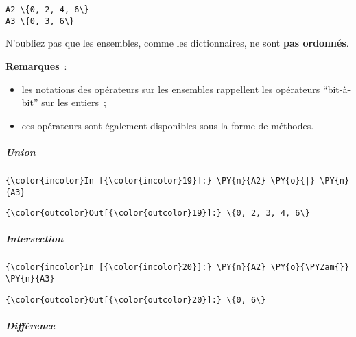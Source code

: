     \begin{Verbatim}[commandchars=\\\{\},frame=single,framerule=0.3mm,rulecolor=\color{cellframecolor}]
A2 \{0, 2, 4, 6\}
A3 \{0, 3, 6\}
\end{Verbatim}

    N'oubliez pas que les ensembles, comme les dictionnaires, ne sont
\textbf{pas ordonnés}.

    \textbf{Remarques}~:

\begin{itemize}
\tightlist
\item
  les notations des opérateurs sur les ensembles rappellent les
  opérateurs ``bit-à-bit'' sur les entiers~;
\item
  ces opérateurs sont également disponibles sous la forme de méthodes.
\end{itemize}

    \hypertarget{union}{%
\subparagraph{Union}\label{union}}

    \begin{Verbatim}[commandchars=\\\{\},frame=single,framerule=0.3mm,rulecolor=\color{cellframecolor}]
{\color{incolor}In [{\color{incolor}19}]:} \PY{n}{A2} \PY{o}{|} \PY{n}{A3}
\end{Verbatim}


\begin{Verbatim}[commandchars=\\\{\},frame=single,framerule=0.3mm,rulecolor=\color{cellframecolor}]
{\color{outcolor}Out[{\color{outcolor}19}]:} \{0, 2, 3, 4, 6\}
\end{Verbatim}
            
    \hypertarget{intersection}{%
\subparagraph{Intersection}\label{intersection}}

    \begin{Verbatim}[commandchars=\\\{\},frame=single,framerule=0.3mm,rulecolor=\color{cellframecolor}]
{\color{incolor}In [{\color{incolor}20}]:} \PY{n}{A2} \PY{o}{\PYZam{}} \PY{n}{A3}
\end{Verbatim}


\begin{Verbatim}[commandchars=\\\{\},frame=single,framerule=0.3mm,rulecolor=\color{cellframecolor}]
{\color{outcolor}Out[{\color{outcolor}20}]:} \{0, 6\}
\end{Verbatim}
            
    \hypertarget{diffuxe9rence}{%
\subparagraph{Différence}\label{diffuxe9rence}}


